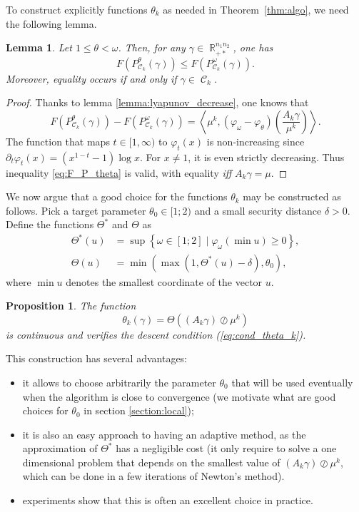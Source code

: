 \documentclass{article} %
\newcommand{\scal}[2]{\left\langle #1 , #2 \right\rangle}
\DeclareMathOperator{\IR}{\mathbb{R}}
\DeclareMathOperator{\Ccal}{\mathcal{C}}
\theoremstyle{plain}
\newtheorem{proposition}{Proposition}
\newtheorem{lemma}{Lemma}
\theoremstyle{definition}
\theoremstyle{remark}
\begin{document}
To construct explicitly functions $\theta_k$ as needed in Theorem~\ref{thm:algo}, we need the following lemma.
\begin{lemma}\label{lemma:F_P_theta}
	Let $1\le \theta < \omega$. Then, for any $\gamma \in \IR_{+*}^{n_1 n_2}$, one has
	\begin{equation}\label{eq:F_P_theta}
	F(P^\theta_{\Ccal_k}(\gamma)) \le F(P^\omega_{\Ccal_k}(\gamma)).
	\end{equation}
	Moreover, equality occurs if and only if $\gamma \in \Ccal_k$.
\end{lemma}
\begin{proof}
	Thanks to lemma \ref{lemma:lyapunov_decrease}, one knows that
	\[
	F(P^\theta_{\Ccal_k}(\gamma)) - F(P^\omega_{\Ccal_k}(\gamma))
	= \scal{\mu^k}{(\varphi_\omega - \varphi_\theta) \left( \frac{A_k \gamma}{\mu^k} \right) } .
	\]
	The function that maps $t \in [1,\infty)$ to $\varphi_t(x)$ is non-increasing since
	$\partial_t \varphi_t(x) =  (x^{1-t} - 1)\log x.$
	For $x\neq 1$, it is even strictly decreasing.
	Thus inequality \eqref{eq:F_P_theta} is valid, with equality \emph{iff} $A_k \gamma = \mu$.
\end{proof}

We now argue that a good choice for the functions $\theta_k$ may be constructed as follows. Pick a target parameter $\theta_0 \in [1;2)$ and a small security distance $\delta>0$. Define the functions $\Theta^*$ and $\Theta$ as
	\begin{align}
	\label{eq:Theta_opt}
	\Theta^*(u) &= \sup \left\{\omega \in [1;2]  \mid \varphi_\omega\left(\min u\right) \ge 0 \right\} ,\\
	\label{eq:Theta}
	\Theta(u) &= \min(\max(1,\Theta^*(u)-\delta),\theta_0),
	\end{align}
	where $\min u$ denotes the smallest coordinate of the vector $u$. 

\begin{proposition}\label{prop:thetachoice}
	The function
	\begin{equation}
	\label{eq:theta_k}
	\theta_k(\gamma) =\Theta\left ((A_k \gamma)\oslash \mu^k\right)
	\end{equation}
	is continuous and verifies the descent condition (\ref{eq:cond_theta_k}).
\end{proposition}
This construction has several advantages:
\begin{itemize}
\item it allows to choose arbitrarily the parameter $\theta_0$ that will be used eventually when the algorithm is close to convergence (we motivate what are good choices for $\theta_0$ in section \ref{section:local});
\item it is also an easy approach to having an adaptive method, as the approximation of $\Theta^*$ has a negligible cost (it only require to solve a one dimensional problem that depends on the smallest value of $(A_k \gamma)\oslash \mu^k$, which can be done in a few iterations of Newton's method).
\item experiments show that this is often an excellent choice in practice.
\end{itemize}
\end{document}
